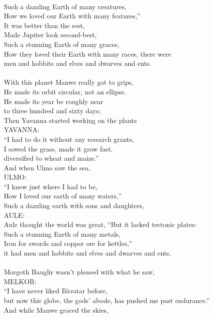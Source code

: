 \begin{multicols}{2}
\\
Such a dazzling Earth of many creatures,
\\
How we loved our Earth with many features,”
\\
It was better than the rest,
\\
Made Jupiter look second-best,
\\
Such a stunning Earth of many graces,
\\
How they loved their Earth with many races, there were
\\
men and hobbits and elves and dwarves and ents.
\\
\\
With this planet Manwe really got to grips,
\\
He made its orbit circular, not an ellipse.
\\
He made its year be roughly near
\\
to three hundred and sixty days;
\\
Then Yavanna started working on the plants
\\
YAVANNA:
\\
“I had to do it without any research grants,
\\
I sowed the grass, made it grow fast,
\\
diversified to wheat and maize.”
\\
And when Ulmo saw the sea,
\\
ULMO:
\\
“I knew just where I had to be,
\\
How I loved our earth of many waters,”
\\
Such a dazzling earth with sons and daughters,
\\
AULE: 
\\
Aule thought the world was great, “But it lacked tectonic plates:
\\
Such a stunning Earth of many metals,
\\
Iron for swords and copper ore for kettles,”
\\
it had men and hobbits and elves and dwarves and ents.
\\
\\
Morgoth Bauglir wasn’t pleased with what he saw,
\\
MELKOR:
\\
“I have never liked Il\`uvatar before,
\\
but now this globe, the gods’ abode, has pushed me past endurance.”
\\
And while Manwe graced the skies,
\\

\end{multicols}
